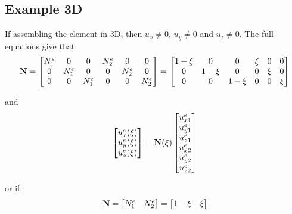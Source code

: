 \subsection{Example 3D}
If assembling the element in 3D, then $ u_x \neq 0 $, $ u_y \neq 0 $ and $ u_z \neq 0 $.
The full equations give that:
\begin{equation}
    \mathbf{N} = \begin{bmatrix}
        N_1^e & 0 & 0 & N_2^e & 0 & 0 \\
        0 & N_1^e & 0 & 0 & N_2^e & 0 \\
        0 & 0 & N_1^e & 0 & 0 & N_2^e \\
    \end{bmatrix}
    = \begin{bmatrix}
        1 - \xi & 0 & 0 & \xi & 0 & 0 \\
        0 & 1 - \xi & 0 & 0 & \xi & 0  \\
        0 & 0 & 1 - \xi & 0 & 0 & \xi \\
    \end{bmatrix}
\end{equation}

and
\begin{equation}
    \begin{bmatrix}
        u_x^e(\xi) \\
        u_y^e(\xi) \\
        u_z^e(\xi) \\
    \end{bmatrix}
    = \mathbf{N}(\xi) \begin{bmatrix}
        u_{x1}^e \\
        u_{y1}^e \\
        u_{z1}^e \\
        u_{x2}^e \\
        u_{y2}^e \\
        u_{z2}^e \\
    \end{bmatrix}
\end{equation}

or if:
\begin{equation}
    \mathbf{N} = \begin{bmatrix}
        N_1^e & N_2^e \\
    \end{bmatrix}
    = \begin{bmatrix}
        1 - \xi & \xi \\
    \end{bmatrix}
\end{equation}

